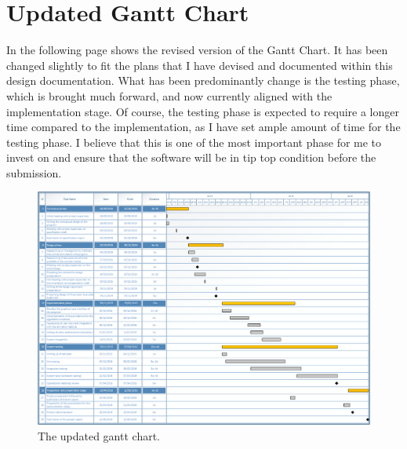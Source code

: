 \section{Updated Gantt Chart}
In the following page shows the revised version of the Gantt Chart. It has been changed slightly to fit the plans that I have devised and documented within this design documentation. What has been predominantly change is the testing phase, which is brought much forward, and now currently aligned with the implementation stage. Of course, the testing phase is expected to require a longer time compared to the implementation, as I have set ample amount of time for the testing phase. I believe that this is one of the most important phase for me to invest on and ensure that the software will be in tip top condition before the submission.

\begin{landscape}
\begin{figure}[H]
\centering
\hspace*{-0.5cm}
\includegraphics[scale=0.78]{images/report_images/ganttChart.png}
\caption{The updated gantt chart.}
\label{ganttChart}
\end{figure}
\end{landscape}
